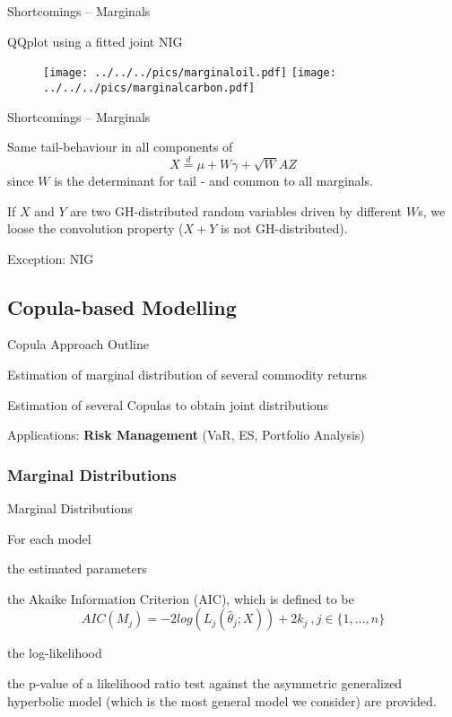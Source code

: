 {Shortcomings -- Marginals} %
\begin{center}
QQplot using a fitted joint NIG
\begin{figure}
\begin{center}
\texttt{[image: ../../../pics/marginaloil.pdf]}
\texttt{[image: ../../../pics/marginalcarbon.pdf]}
\end{center}
\end{figure}
\end{center}

{Shortcomings -- Marginals} %
\item Same tail-behaviour in all components of
$$X\stackrel{d}{=}\mu+W\gamma+\sqrt{W}AZ$$
since $W$ is the determinant for tail - and common to all
marginals. \item If $X$ and $Y$ are two GH-distributed random
variables driven by different $W$s, we loose the convolution
property ($X+Y$ is not GH-distributed). \item Exception: NIG

\subsection{Copula-based Modelling}

{Copula Approach Outline} %
\item Estimation of marginal  distribution of several commodity
returns \item Estimation of several Copulas to obtain joint
distributions \item Applications: \textbf{Risk Management} (VaR,
ES, Portfolio Analysis)

\subsubsection{Marginal Distributions}

{Marginal Distributions}

For each model
\item the estimated parameters \item the Akaike Information
Criterion (AIC), which is defined to be
    \[AIC(M_j)=-2log(L_j(\hat{\theta}_j; X))+2k_j\ ,j\in\{1,\ldots,n\}\]
\item the log-likelihood \item the p-value of a likelihood ratio
test against the asymmetric generalized hyperbolic model (which is
the most general model we consider)
are provided.


